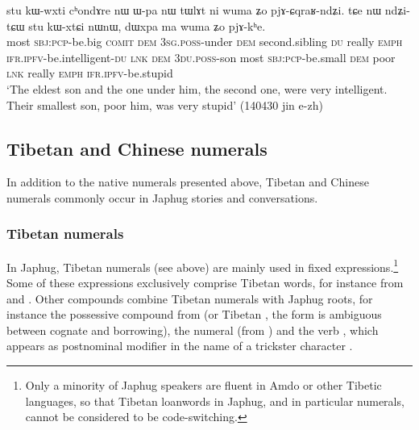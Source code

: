 \begin{exe}
\ex  \label{ex:Wpa.nW}
\gll stu kɯ-wxti cʰondɤre nɯ ɯ-pa nɯ tɯlɤt ni wuma ʑo pjɤ-ɕqraʁ-ndʑi. tɕe nɯ ndʑi-tɕɯ stu kɯ-xtɕi nɯnɯ, dɯxpa ma wuma ʑo pjɤ-kʰe. \\
most \textsc{sbj}:\textsc{pcp}-be.big \textsc{comit} \textsc{dem} \textsc{3sg}.\textsc{poss}-under \textsc{dem} second.sibling \textsc{du} really \textsc{emph} \textsc{ifr}.\textsc{ipfv}-be.intelligent-\textsc{du} \textsc{lnk} \textsc{dem} \textsc{3du}.\textsc{poss}-son most \textsc{sbj}:\textsc{pcp}-be.small \textsc{dem} poor \textsc{lnk} really \textsc{emph} \textsc{ifr}.\textsc{ipfv}-be.stupid \\
\glt `The eldest son and the one under him, the second one, were very intelligent. Their smallest son, poor him, was very stupid' (140430 jin e-zh) 
\end{exe}
 
\subsection{Tibetan and Chinese numerals}  
In addition to the native numerals presented above, Tibetan and Chinese numerals commonly occur in Japhug stories and conversations.

 \subsubsection{Tibetan numerals} \label{sec:tibetan.numerals}

In Japhug, Tibetan numerals (see  above) are mainly used in fixed expressions.\footnote{Only a minority of Japhug speakers are fluent in Amdo or other Tibetic languages, so that Tibetan loanwords in Japhug, and in particular numerals, cannot be considered to be code-switching. 
} Some of these expressions exclusively comprise Tibetan words, for instance  from  and .  Other compounds combine Tibetan numerals with Japhug roots, for instance the possessive compound from  (or Tibetan , the form is ambiguous between cognate and borrowing), the numeral  (from  ) and the verb , which appears as postnominal modifier in the name of a trickster character .
 
